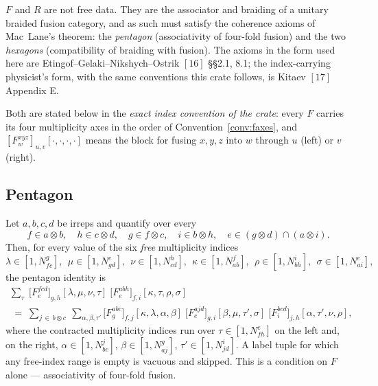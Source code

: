 \documentclass[11pt,a4paper]{article}
\theoremstyle{plain}
\theoremstyle{definition}
\begin{document}
$F$ and $R$ are not free data. They are the associator and braiding of a
unitary braided fusion category, and as such must satisfy the coherence axioms
of Mac~Lane's theorem: the \emph{pentagon} (associativity of four-fold fusion)
and the two \emph{hexagons} (compatibility of braiding with fusion). The
axioms in the form used here are Etingof--Gelaki--Nikshych--Ostrik $[16]$
\S\S2.1, 8.1; the index-carrying physicist's form, with the same conventions
this crate follows, is Kitaev $[17]$ Appendix E.

Both are stated below in the \emph{exact index convention of the crate}: every
$F$ carries its four multiplicity axes in the order of
Convention~\ref{conv:faxes}, and $[F^{xyz}_{w}]_{u,v}[\cdot,\cdot,\cdot,\cdot]$
means the block for fusing $x,y,z$ into $w$ through $u$ (left) or $v$ (right).

\subsection{Pentagon}

Let $a,b,c,d$ be irreps and quantify over every
\[
  f\in a\otimes b,\quad h\in c\otimes d,\quad g\in f\otimes c,\quad
  i\in b\otimes h,\quad e\in (g\otimes d)\cap(a\otimes i).
\]
Then, for every value of the six \emph{free} multiplicity indices
\[
  \lambda\in[1,N^g_{fc}],\ \ \mu\in[1,N^e_{gd}],\ \ \nu\in[1,N^h_{cd}],\ \
  \kappa\in[1,N^f_{ab}],\ \ \rho\in[1,N^i_{bh}],\ \ \sigma\in[1,N^e_{ai}],
\]
the pentagon identity is
\begin{multline}\label{eq:pentagon}
  \sum_{\tau}\;
    \bigl[F^{fcd}_{e}\bigr]_{g,h}[\lambda,\mu,\nu,\tau]\;
    \bigl[F^{abh}_{e}\bigr]_{f,i}[\kappa,\tau,\rho,\sigma]
  \\[0.3em]
  \;=\;
  \sum_{j\,\in\, b\otimes c}\ \sum_{\alpha,\beta,\tau'}
    \bigl[F^{abc}_{g}\bigr]_{f,j}[\kappa,\lambda,\alpha,\beta]\;
    \bigl[F^{ajd}_{e}\bigr]_{g,i}[\beta,\mu,\tau',\sigma]\;
    \bigl[F^{bcd}_{i}\bigr]_{j,h}[\alpha,\tau',\nu,\rho] ,
\end{multline}
where the contracted multiplicity indices run over
$\tau\in[1,N^e_{fh}]$ on the left and, on the right,
$\alpha\in[1,N^j_{bc}]$, $\beta\in[1,N^g_{aj}]$, $\tau'\in[1,N^i_{jd}]$. A
label tuple for which any free-index range is empty is vacuous and skipped.
This is a condition on $F$ alone --- associativity of four-fold fusion.
\end{document}
